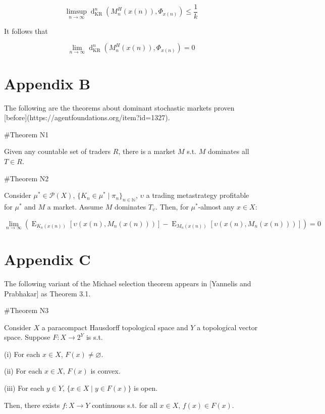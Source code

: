 \documentclass[a4paper]{article}
\newcommand{\Comment}[1]{}
\DeclareMathOperator{\E}{E}
\newcommand{\Nats}{\mathbb{N}}
\newcommand{\Prob}{\mathcal{P}}
\newcommand{\Dkr}{\operatorname{d}_{\text{KR}}}
\begin{document}
$$\limsup_{n \rightarrow \infty} {\Dkr^n(M^H_n(x(n)),\Phi_{x(n)})} \leq \frac{1}{k}$$

It follows that

$$\lim_{n \rightarrow \infty} {\Dkr^n(M^H_n(x(n)),\Phi_{x(n)})} = 0$$

\section{Appendix B}

The following are the theorems about dominant stochastic markets proven [before](https://agentfoundations.org/item?id=1327).

\#Theorem N1

Given any countable set of traders $R$, there is a market ${M}$ s.t. ${M}$ dominates all ${T \in R}$.

\#Theorem N2

Consider ${\mu^* \in \Prob(X)}$, ${\{K_n \in \mu^* \mid \pi_{n}\}_{n \in \Nats}}$, ${\upsilon}$ a trading metastrategy profitable for ${\mu^*}$ and ${M}$ a market. Assume ${M}$ dominates ${T_\upsilon}$. Then, for ${\mu^*}$-almost any ${x \in X}$:

$$\lim_{n \rightarrow \infty} (\E_{K_n(x(n))}[\upsilon(x(n),M_n(x(n)))]-\E_{M_n(x(n))}[\upsilon(x(n),M_n(x(n)))])= 0$$

\section{Appendix C}

The following variant of the Michael selection theorem appears in [Yannelis and Prabhakar]\Comment{(https://www.biz.uiowa.edu/faculty/nyannelis/publications/Existence_of_Maximal_Elements_and_Equilibria_in_Linear_Topological_Spaces.pdf)} as Theorem 3.1.

\#Theorem N3

Consider $X$ a paracompact Hausdorff topological space and $Y$ a topological vector space. Suppose $F: X \rightarrow 2^Y$ is s.t.

(i) For each $x \in X$, $F(x) \ne \varnothing$.

(ii) For each $x \in X$, $F(x)$ is convex.

(iii) For each $y \in Y$, $\{x \in X \mid y \in F(x)\}$ is open.

Then, there exists $f: X \rightarrow Y$ continuous s.t. for all $x \in X$, $f(x) \in F(x)$.
\end{document}
